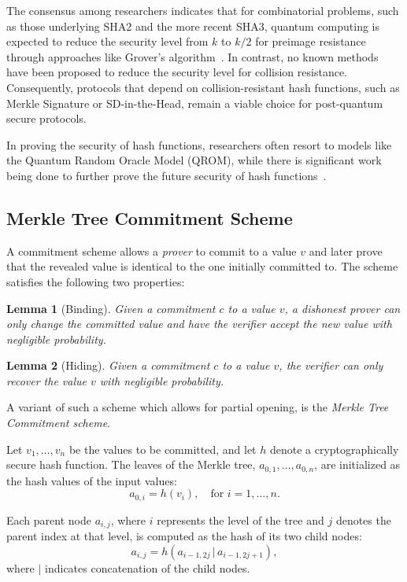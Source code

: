 \documentclass[twoside,11pt,openright]{report}
\theoremstyle{definition}
\theoremstyle{plain}
\newtheorem{lemma}{Lemma}[section]
\begin{document}
The consensus among researchers indicates that for combinatorial problems, such as those underlying SHA2 and the more recent SHA3, quantum computing is expected to reduce the security level from $k$ to $k/2$ for preimage resistance through approaches like Grover's algorithm~\cite{nielsen2010quantumgrover}. In contrast, no known methods have been proposed to reduce the security level for collision resistance. Consequently, protocols that depend on collision-resistant hash functions, such as Merkle Signature or SD-in-the-Head, remain a viable choice for post-quantum secure protocols.

In proving the security of hash functions, researchers often resort to models like the Quantum Random Oracle Model (QROM), while there is significant work being done to further prove the future security of hash functions~\cite{dtuPostquantumSecurity}.

\subsection{Merkle Tree Commitment Scheme}
A commitment scheme allows a \textit{prover} to commit to a value $v$ and later prove that the revealed value is identical to the one initially committed to. The scheme satisfies the following two properties:

\begin{lemma}[Binding]
  \label{lem:binding}
  Given a commitment $c$ to a value $v$, a dishonest prover can only change the committed value and have the verifier accept the new value with negligible probability.
\end{lemma}

\begin{lemma}[Hiding]
  \label{lem:hiding}
  Given a commitment $c$ to a value $v$, the verifier can only recover the value $v$ with negligible probability.
\end{lemma}

A variant of such a scheme which allows for partial opening, is the \textit{Merkle Tree Commitment scheme}.

Let $v_1, \dots, v_n$ be the values to be committed, and let $h$ denote a cryptographically secure hash function. The leaves of the Merkle tree, $a_{0,1}, \dots, a_{0,n}$, are initialized as the hash values of the input values:
\[
  a_{0,i} = h(v_i), \quad \text{for } i = 1, \dots, n.
\]

Each parent node $a_{i,j}$, where $i$ represents the level of the tree and $j$ denotes the parent index at that level, is computed as the hash of its two child nodes:
\[
  a_{i,j} = h(a_{i-1,2j} \, | \, a_{i-1,2j+1}),
\]
where $|$ indicates concatenation of the child nodes.
\end{document}
